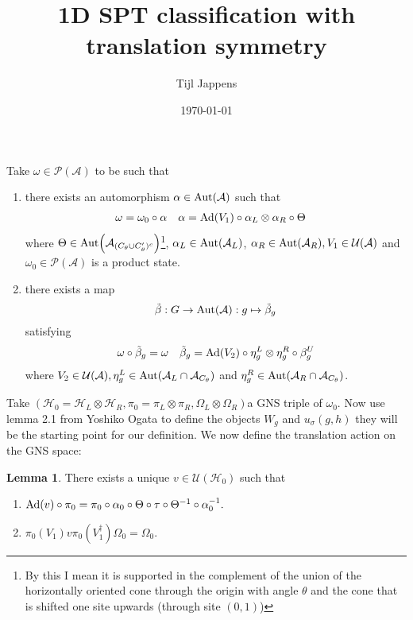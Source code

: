 \documentclass[12pt,a4paper,twoside]{article}
\title{1D SPT classification with translation symmetry}
\author{Tijl Jappens}
\date{\today}
\let\originalleft\left
\let\originalright\right
\renewcommand{\left}{\mathopen{}\mathclose\bgroup\originalleft}
\renewcommand{\right}{\aftergroup\egroup\originalright}
\newcommand{\UU}{\mathcal U}
\newcommand{\PP}{\mathcal P}
\newcommand{\HH}{\mathcal H}
\renewcommand{\AA}{\mathcal A}
\newcommand{\Ad}[1]{\textrm{Ad}\left(#1\right)}
\newcommand{\Aut}[1]{\textrm{Aut}\left(#1\right)}
\theoremstyle{definition}
\newtheorem{lemma}[theorem]{Lemma}
\numberwithin{equation}{section}
\begin{document}
Take $\omega\in\PP(\AA)$ to be such that
\begin{enumerate}
	\item  there exists an automorphism $\alpha\in\Aut{\AA}$ such that
	\begin{align}
		\omega&=\omega_0\circ\alpha&\alpha&=\Ad{V_1}\circ\alpha_L\otimes\alpha_R\circ\Theta
	\end{align}
	where $\Theta\in\Aut{\AA_{(C_\theta\cup C_\theta')^c}}$\footnote{By this I mean it is supported in the complement of the union of the horizontally oriented cone through the origin with angle $\theta$ and the cone that is shifted one site upwards (through site $(0,1)$)}, $\alpha_L\in\Aut{\AA_L}$, $\alpha_R\in\Aut{\AA_R},V_1\in\UU(\AA)$ and $\omega_0\in\PP(\AA)$ is a product state.
	\item there exists a map
	\begin{equation}
		\tilde\beta:G\rightarrow\Aut{\AA}:g\mapsto\tilde\beta_g
	\end{equation}
	satisfying
	\begin{align}
		\omega\circ\tilde\beta_g&=\omega&\tilde\beta_g=\Ad{V_2}\circ\eta^L_g\otimes\eta^R_g\circ\beta^U_g
	\end{align}
	where $V_2\in\UU(\AA),\eta^L_g\in\Aut{\AA_L\cap\AA_{C_\theta}}$ and $\eta^R_g\in\Aut{\AA_R\cap\AA_{C_\theta}}$.
\end{enumerate}
Take $(\HH_0=\HH_L\otimes\HH_R,\pi_0=\pi_L\otimes\pi_R,\Omega_L\otimes\Omega_R)$a GNS triple of $\omega_0$. Now use lemma 2.1 from Yoshiko Ogata \cite{ogata2021h3gmathbb} to define the objects $W_g$ and $u_\sigma(g,h)$ they will be the starting point for our definition. We now define the translation action on the GNS space:
\begin{lemma}
	There exists a unique $v\in\UU(\HH_0)$ such that
	\begin{enumerate}
		\item $\Ad{v}\circ\pi_0=\pi_0\circ\alpha_0\circ\Theta\circ\tau\circ\Theta^{-1}\circ\alpha_0^{-1}.$
		\item $\pi_0(V_1)v\pi_0(V_1^\dagger)\Omega_0=\Omega_0.$
	\end{enumerate}
\end{lemma}


\end{document}

